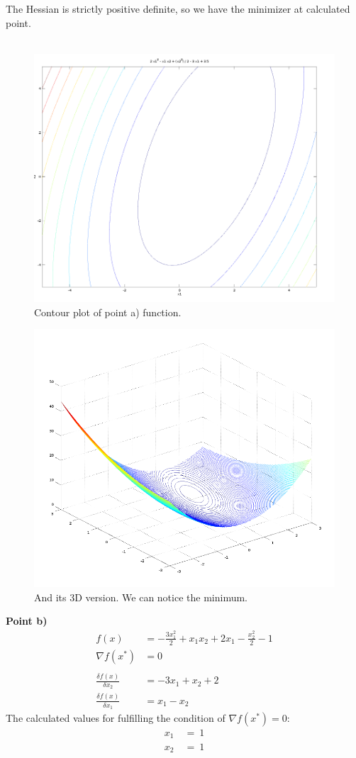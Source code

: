 \documentclass[eng,openany]{mgr}
\begin{document}
The Hessian is strictly positive definite, so we have the minimizer at calculated point.\\
\\

\begin{figure}[h]
	\centering
	\includegraphics[width=0.7\linewidth]{screenshot004}
	\caption{Contour plot of point a) function.}
	\label{fig:screenshot004}
\end{figure}

\begin{figure}[h]
\centering
\includegraphics[width=0.7\linewidth]{screenshot008}
\caption{And its 3D version. We can notice the minimum.}
\label{fig:screenshot008}
\end{figure}

\clearpage

\textbf{Point b)}
\begin{align*}
f(x) &= - \frac{3 x_{1}^{2}}{2} + x_{1} x_{2} + 2 x_{1} - \frac{x_{2}^{2}}{2} - 1\\
\nabla f(x^*) &= 0\\ \\
\frac{\delta f(x)}{\delta x_2} &= - 3 x_{1} + x_{2} + 2
\\
\frac{\delta f(x)}{\delta x_1} &= x_{1} - x_{2}
\end{align*}
The calculated values for fulfilling the condition of $\nabla f(x^*) = 0$:
\begin{align*}
x_1\ &=\ 1\\
x_2\ &=\ 1
\end{align*}
\end{document}
